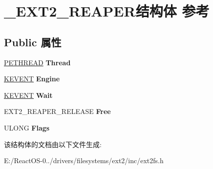 \hypertarget{struct___e_x_t2___r_e_a_p_e_r}{}\section{\+\_\+\+E\+X\+T2\+\_\+\+R\+E\+A\+P\+E\+R结构体 参考}
\label{struct___e_x_t2___r_e_a_p_e_r}
\subsection*{Public 属性}
\begin{DoxyCompactItemize}
\item 
\mbox{\label{struct___e_x_t2___r_e_a_p_e_r_af6344a1f68962c596895b097ec3a34bb}} 
\hyperlink{struct___e_t_h_r_e_a_d}{P\+E\+T\+H\+R\+E\+AD} {\bfseries Thread}
\item 
\mbox{\label{struct___e_x_t2___r_e_a_p_e_r_a29fbc30c506abe2642bf8eebb23a1592}} 
\hyperlink{struct___k_e_v_e_n_t}{K\+E\+V\+E\+NT} {\bfseries Engine}
\item 
\mbox{\label{struct___e_x_t2___r_e_a_p_e_r_aa5becb12fbc68947dc3500e3f60bb496}} 
\hyperlink{struct___k_e_v_e_n_t}{K\+E\+V\+E\+NT} {\bfseries Wait}
\item 
\mbox{\label{struct___e_x_t2___r_e_a_p_e_r_a6672979d0bb29c2cde5506520739be1a}} 
E\+X\+T2\+\_\+\+R\+E\+A\+P\+E\+R\+\_\+\+R\+E\+L\+E\+A\+SE {\bfseries Free}
\item 
\mbox{\label{struct___e_x_t2___r_e_a_p_e_r_a2b985175f84fe92d9abeb33a6aa167d2}} 
U\+L\+O\+NG {\bfseries Flags}
\end{DoxyCompactItemize}


该结构体的文档由以下文件生成\+:\begin{DoxyCompactItemize}
\item 
E\+:/\+React\+O\+S-\/0../drivers/filesystems/ext2/inc/ext2fs.\+h\end{DoxyCompactItemize}
